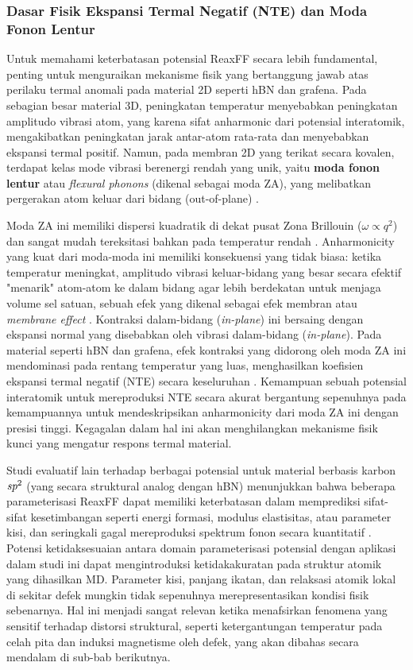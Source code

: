 \subsubsection{Dasar Fisik Ekspansi Termal Negatif (NTE) dan Moda Fonon Lentur}
Untuk memahami keterbatasan potensial ReaxFF secara lebih fundamental, penting untuk menguraikan mekanisme fisik yang bertanggung jawab atas perilaku termal anomali pada material 2D seperti hBN dan grafena. Pada sebagian besar material 3D, peningkatan temperatur menyebabkan peningkatan amplitudo vibrasi atom, yang karena sifat anharmonic dari potensial interatomik, mengakibatkan peningkatan jarak antar-atom rata-rata dan menyebabkan ekspansi termal positif. Namun, pada membran 2D yang terikat secara kovalen, terdapat kelas mode vibrasi berenergi rendah yang unik, yaitu \textbf{moda fonon lentur} atau \textit{flexural phonons} (dikenal sebagai moda ZA), yang melibatkan pergerakan atom keluar dari bidang (out-of-plane) \citep{Sarikurt2022, Mann2017}.

Moda ZA ini memiliki dispersi kuadratik di dekat pusat Zona Brillouin ($\omega \propto q^2$) dan sangat mudah tereksitasi bahkan pada temperatur rendah \citep{CastroNeto2009, Wen2014}. Anharmonicity yang kuat dari moda-moda ini memiliki konsekuensi yang tidak biasa: ketika temperatur meningkat, amplitudo vibrasi keluar-bidang yang besar secara efektif "menarik" atom-atom ke dalam bidang agar lebih berdekatan untuk menjaga volume sel satuan, sebuah efek yang dikenal sebagai efek membran atau \textit{membrane effect} \citep{Mann2017, Yates1972}. Kontraksi dalam-bidang (\textit{in-plane}) ini bersaing dengan ekspansi normal yang disebabkan oleh vibrasi dalam-bidang (\textit{in-plane}). Pada material seperti hBN dan grafena, efek kontraksi yang didorong oleh moda ZA ini mendominasi pada rentang temperatur yang luas, menghasilkan koefisien ekspansi termal negatif (NTE) secara keseluruhan \citep{Du2017, Yoon2011}. Kemampuan sebuah potensial interatomik untuk mereproduksi NTE secara akurat bergantung sepenuhnya pada kemampuannya untuk mendeskripsikan anharmonicity dari moda ZA ini dengan presisi tinggi. Kegagalan dalam hal ini akan menghilangkan mekanisme fisik kunci yang mengatur respons termal material.

Studi evaluatif lain terhadap berbagai potensial untuk material berbasis karbon $\emph{sp}^2$ (yang secara struktural analog dengan hBN) menunjukkan bahwa beberapa parameterisasi ReaxFF dapat memiliki keterbatasan dalam memprediksi sifat-sifat kesetimbangan seperti energi formasi, modulus elastisitas, atau parameter kisi, dan seringkali gagal mereproduksi spektrum fonon secara kuantitatif \citep{Fthenakis2022, Deringer2020}. Potensi ketidaksesuaian antara domain parameterisasi potensial dengan aplikasi dalam studi ini dapat mengintroduksi ketidakakuratan pada struktur atomik yang dihasilkan MD. Parameter kisi, panjang ikatan, dan relaksasi atomik lokal di sekitar defek mungkin tidak sepenuhnya merepresentasikan kondisi fisik sebenarnya. Hal ini menjadi sangat relevan ketika menafsirkan fenomena yang sensitif terhadap distorsi struktural, seperti ketergantungan temperatur pada celah pita dan induksi magnetisme oleh defek, yang akan dibahas secara mendalam di sub-bab berikutnya.

